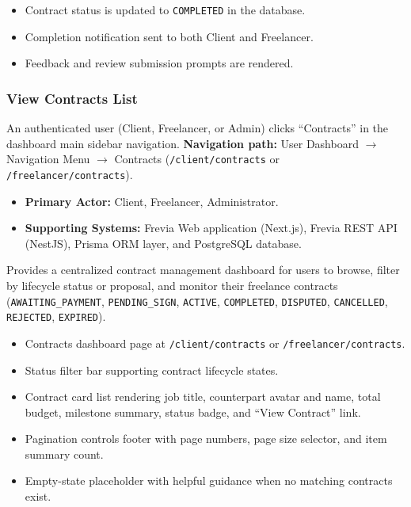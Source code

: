 \begin{itemize}[leftmargin=1.6em,topsep=3pt,itemsep=2pt,parsep=0pt,label=$\bullet$]
      \item Contract status is updated to \texttt{COMPLETED} in the database.
      \item Completion notification sent to both Client and Freelancer.
      \item Feedback and review submission prompts are rendered.
\end{itemize}

\subsubsection{ View Contracts List}

An authenticated user (Client, Freelancer, or Admin) clicks ``Contracts'' in the dashboard main sidebar navigation.\newline
\textbf{Navigation path:} User Dashboard $\rightarrow$ Navigation Menu $\rightarrow$ Contracts (\texttt{/client/contracts} or \texttt{/freelancer/contracts}).


\begin{itemize}[leftmargin=1.6em,topsep=3pt,itemsep=2pt,parsep=0pt,label=$\bullet$]
      \item \textbf{Primary Actor:} Client, Freelancer, Administrator.
      \item \textbf{Supporting Systems:} Frevia Web application (Next.js), Frevia REST API (NestJS), Prisma ORM layer, and PostgreSQL database.
\end{itemize}

\noindent Provides a centralized contract management dashboard for users to browse, filter by lifecycle status or proposal, and monitor their freelance contracts (\texttt{AWAITING\_PAYMENT}, \texttt{PENDING\_SIGN}, \texttt{ACTIVE}, \texttt{COMPLETED}, \texttt{DISPUTED}, \texttt{CANCELLED}, \texttt{REJECTED}, \texttt{EXPIRED}).

\begin{itemize}[leftmargin=1.6em,topsep=3pt,itemsep=2pt,parsep=0pt,label=$\bullet$]
      \item Contracts dashboard page at \texttt{/client/contracts} or \texttt{/freelancer/contracts}.
      \item Status filter bar supporting contract lifecycle states.
      \item Contract card list rendering job title, counterpart avatar and name, total budget, milestone summary, status badge, and ``View Contract'' link.
      \item Pagination controls footer with page numbers, page size selector, and item summary count.
      \item Empty-state placeholder with helpful guidance when no matching contracts exist.
\end{itemize}

